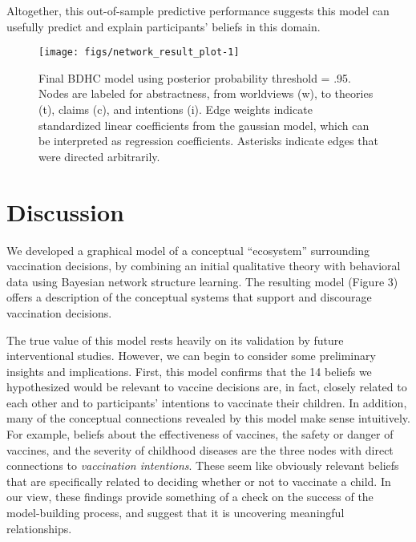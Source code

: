 \documentclass[10pt, letterpaper]{article}
\newenvironment{CodeChunk}{}{}
\begin{document}
Altogether, this out-of-sample predictive performance suggests this
model can usefully predict and explain participants' beliefs in this
domain.

\begin{CodeChunk}
\begin{figure*}[h]

{\centering \texttt{[image: figs/network\_result\_plot-1]} 

}

\caption[Final BDHC model using posterior probability threshold = .95]{Final BDHC model using posterior probability threshold = .95. Nodes are labeled for abstractness, from worldviews (w), to theories (t), claims (c), and intentions (i). Edge weights indicate standardized linear coefficients from the gaussian model, which can be interpreted as regression coefficients. Asterisks indicate edges that were directed arbitrarily.}\label{fig:network_result_plot}
\end{figure*}
\end{CodeChunk}

\section{Discussion}\label{discussion}

We developed a graphical model of a conceptual ``ecosystem'' surrounding
vaccination decisions, by combining an initial qualitative theory with
behavioral data using Bayesian network structure learning. The resulting
model (Figure 3) offers a description of the conceptual systems that
support and discourage vaccination decisions.

The true value of this model rests heavily on its validation by future
interventional studies. However, we can begin to consider some
preliminary insights and implications. First, this model confirms that
the 14 beliefs we hypothesized would be relevant to vaccine decisions
are, in fact, closely related to each other and to participants'
intentions to vaccinate their children. In addition, many of the
conceptual connections revealed by this model make sense intuitively.
For example, beliefs about the effectiveness of vaccines, the safety or
danger of vaccines, and the severity of childhood diseases are the three
nodes with direct connections to \emph{vaccination intentions}. These
seem like obviously relevant beliefs that are specifically related to
deciding whether or not to vaccinate a child. In our view, these
findings provide something of a check on the success of the
model-building process, and suggest that it is uncovering meaningful
relationships.
\end{document}
